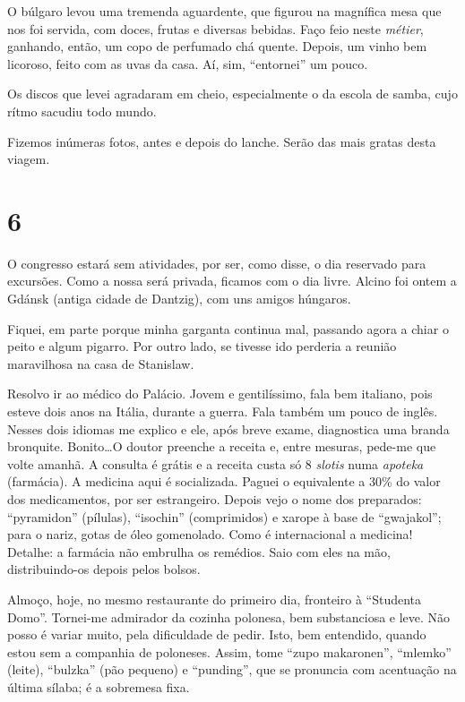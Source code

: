 O búlgaro levou uma tremenda aguardente, que figurou na magnífica mesa que nos foi servida, com doces, frutas e diversas bebidas. Faço feio neste \textit{métier}, ganhando, então, um copo de perfumado chá quente. Depois, um vinho bem licoroso, feito com as uvas da casa. Aí, sim, ``entornei'' um pouco.

Os discos que levei agradaram em cheio, especialmente o da escola de samba, cujo rítmo sacudiu todo mundo.

Fizemos inúmeras fotos, antes e depois do lanche. Serão das mais gratas desta viagem.

\section*{6 \adfflatleafright {}}
O congresso estará sem atividades, por ser, como disse, o dia reservado para excursões. Como a nossa será privada, ficamos com o dia livre. Alcino foi ontem a Gdánsk (antiga cidade de Dantzig), com uns amigos húngaros.

Fiquei, em parte porque minha garganta continua mal, passando agora a chiar o peito e algum pigarro. Por outro lado, se tivesse ido perderia a reunião maravilhosa na casa de Stanislaw.

Resolvo ir ao médico do Palácio. Jovem e gentilíssimo, fala bem italiano, pois esteve dois anos na Itália, durante a guerra. Fala também um pouco de inglês. Nesses dois idiomas me explico e ele, após breve exame, diagnostica uma branda bronquite. Bonito\ldots O doutor preenche a receita e, entre mesuras, pede-me que volte amanhã. A consulta é grátis e a receita custa só 8 \textit{slotis} numa \textit{apoteka} (farmácia). A medicina aqui é socializada. Paguei o equivalente a 30\% do valor dos medicamentos, por ser estrangeiro. Depois vejo o nome dos preparados: ``pyramidon'' (pílulas), ``isochin'' (comprimidos) e xarope à base de ``gwajakol''; para o nariz, gotas de óleo gomenolado. Como é internacional a medicina! Detalhe: a farmácia não embrulha os remédios. Saio com eles na mão, distribuindo-os depois pelos bolsos.

Almoço, hoje, no mesmo restaurante do primeiro dia, fronteiro à ``Studenta Domo''. Tornei-me admirador da cozinha polonesa, bem substanciosa e leve. Não posso é variar muito, pela dificuldade de pedir. Isto, bem entendido, quando estou sem a companhia de poloneses. Assim, tome ``zupo makaronen'', ``mlemko'' (leite), ``bulzka'' (pão pequeno) e ``punding'', que se pronuncia com acentuação na última sílaba; é a sobremesa fixa.

